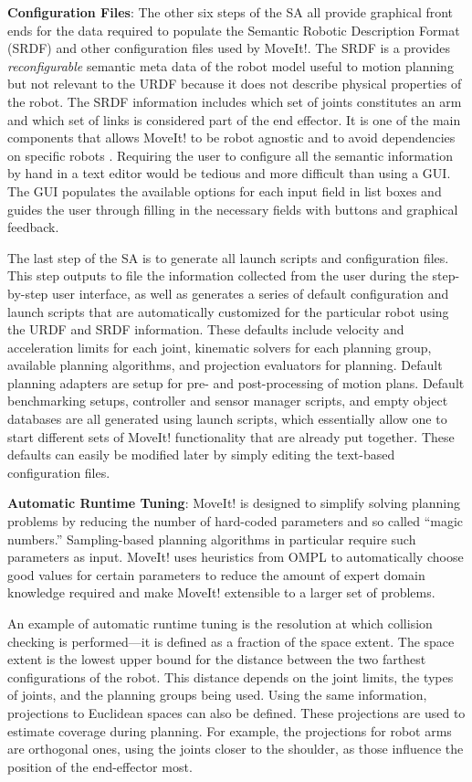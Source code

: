 \documentclass[10pt,journal,compsoc]{joser1}
\begin{document}
{{\bf Configuration Files}: The other six steps of the SA all provide graphical front ends for the data required to populate the Semantic Robotic Description Format (SRDF) and other configuration files used by MoveIt!. The SRDF is a provides \textit{reconfigurable} semantic meta data of the robot model useful to motion planning but not relevant to the URDF because it does not describe physical properties of the robot. The SRDF information includes which set of joints constitutes an arm and which set of links is considered part of the end effector. It is one of the main components that allows MoveIt! to be robot agnostic and to avoid dependencies on specific robots \cite{moveit}. Requiring the user to configure all the semantic information by hand in a text editor would be tedious and more difficult than using a GUI. The GUI populates the available options for each input field in list boxes and guides the user through filling in the necessary fields with buttons and graphical feedback.

The last step of the SA is to generate all launch scripts and configuration files. This step outputs to file the information collected from the user during the step-by-step user interface, as well as generates a series of default configuration and launch scripts that are automatically customized for the particular robot using the URDF and SRDF information. These defaults include velocity and acceleration limits for each joint, kinematic solvers for each planning group, available planning algorithms, and projection evaluators for planning. Default planning adapters are setup for pre- and post-processing of motion plans. Default benchmarking setups, controller and sensor manager scripts, and empty object databases are all generated using launch scripts, which essentially allow one to start different sets of MoveIt! functionality that are already put together. These defaults can easily be modified later by simply editing the text-based configuration files.

{\bf Automatic Runtime Tuning}: MoveIt! is designed to simplify solving planning problems by reducing the number of hard-coded parameters and so called ``magic numbers.'' Sampling-based planning algorithms in particular require such parameters as input. MoveIt! uses heuristics from OMPL to automatically choose good values for certain parameters to reduce the amount of expert domain knowledge required and make MoveIt! extensible to a larger set of problems. 

An example of automatic runtime tuning is the resolution at which collision checking is performed---it is defined as a fraction of the space extent. The space extent is the lowest upper bound for the distance between the two farthest configurations of the robot. This distance depends on the joint limits, the types of joints, and the planning groups being used. Using the same information, projections to Euclidean spaces can also be defined. These projections are used to estimate coverage during planning. For example, the projections for robot arms are orthogonal ones, using the joints closer to the shoulder, as those influence the position of the end-effector most.  

}
\end{document}
